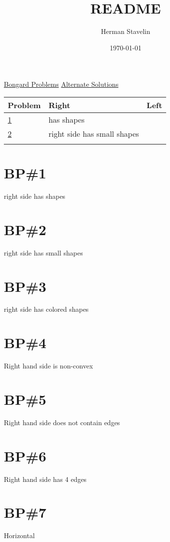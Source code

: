 \documentclass[11pt]{article}
\author{Herman Stavelin}
\date{\today}
\title{README}
\begin{document}
\maketitle
\tableofcontents

\href{http://www.foundalis.com/res/bps/bpidx.htm}{Bongard Problems}
\href{https://en.wikibooks.org/wiki/Puzzles/Bongard_problems/Solutions}{Alternate Solutions}


\begin{center}
\begin{tabular}{lll}
Problem & Right & Left\\
\hline
\href{http://www.foundalis.com/res/bps/bongard/p001.htm}{1} & has shapes & \\
\href{http://www.foundalis.com/res/bps/bongard/p002.htm}{2} & right side has small shapes & \\
 &  & \\
\end{tabular}
\end{center}

\section{BP\#1}
\label{sec-1}
right side has shapes
\section{BP\#2}
\label{sec-2}
right side has small shapes

\section{BP\#3}
\label{sec-3}
right side has colored shapes
\section{BP\#4}
\label{sec-4}
Right hand side is non-convex
\section{BP\#5}
\label{sec-5}
Right hand side does not contain edges
\section{BP\#6}
\label{sec-6}
Right hand side has 4 edges
\section{BP\#7}
\label{sec-7}
Horizontal
\end{document}
